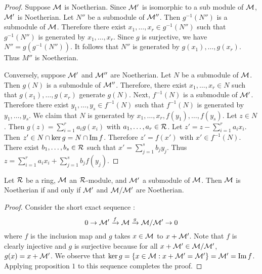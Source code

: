 \begin{proof}
  Suppose $\mathcal{M}$ is Noetherian. Since $\mathcal{M}'$ is isomorphic to a sub module of $\mathcal{M}$, $\mathcal{M}'$ is Noetherian. Let $N''$ be a submodule of $\mathcal{M}''$. Then $g^{-1}(N'')$ is a submodule of $\mathcal{M}$. Therefore there exist $x_1,\ldots, x_r\in g^{-1}(N'')$ such that $g^{-1}(N'')$ is generated by $x_1,\ldots, x_r$. Since $g$ is surjective, we have $N''=g(g^{-1}(N''))$. It follows that $N''$ is generated by $g(x_1),\ldots, g(x_r)$. Thus $M''$ is Noetherian.

  Conversely, suppose $\mathcal{M}'$ and $\mathcal{M}''$ are Noetherian. Let $N$ be a submodule of $\mathcal{M}$. Then $g(N)$ is a submodule of $\mathcal{M}''$. Therefore, there exist $x_1,\ldots, x_r\in N$ such that $g(x_1),\ldots, g(x_r)$ generate $g(N)$. Next, $f^{-1}(N)$ is a submodule of $\mathcal{M}'$. Therefore there exist $y_1,\ldots, y_s\in f^{-1}(N)$ such that $f^{-1}(N)$ is
   generated by $y_1,\ldots, y_s$. We claim that $N$ is generated by $x_1,\ldots, x_r, f(y_1),\ldots, f(y_s)$. Let $z\in N$. Then
    $g(z)=\sum_{i=1}^r a_i g(x_i)$ with $a_1,\ldots, a_r\in \mathcal{R}$. Let $z'=z-\sum_{i=1}^r a_i x_i$. Then $z'\in N\cap \ker{g} = N\cap \operatorname{Im}{f}$. Therefore $z'=f(x')$ with $x'\in f^{-1}(N)$. There exist $b_1,\ldots, b_s\in \mathcal{R}$ such that $x'=\sum_{j=1}^s b_j y_j$. Thus $z=\sum_{i=1}^r a_i x_i + \sum_{j=1}^s b_j f(y_j)$.
\end{proof}

\begin{prop}
  Let $\mathcal{R}$ be a ring, $\mathcal{M}$ an $\mathcal{R}$-module, and $\mathcal{M}'$ a submodule of $\mathcal{M}$. Then $\mathcal{M}$ is Noetherian if and only if $\mathcal{M}'$ and $\mathcal{M}/\mathcal{M}'$ are Noetherian.
\end{prop}

\begin{proof}
  Consider the short exact sequence :
  \[0\rightarrow \mathcal{M}'\xrightarrow{f}\mathcal{M}\xrightarrow{g}\mathcal{M}/\mathcal{M}'\rightarrow 0\]
  where $f$ is the inclusion map and $g$ takes $x\in \mathcal{M}$ to $x+ \mathcal{M}'$. Note that $f$ is clearly injective and $g$ is surjective because for all $x+\mathcal{M}'\in \mathcal{M}/\mathcal{M}'$, $g(x)=x+\mathcal{M}'$. We observe that $\ker{g}=\{x\in \mathcal{M} : x+\mathcal{M}' = \mathcal{M}'\} = \mathcal{M}' = \operatorname{Im}{f}$.
  Applying proposition $1$ to this sequence completes the proof.
\end{proof}


